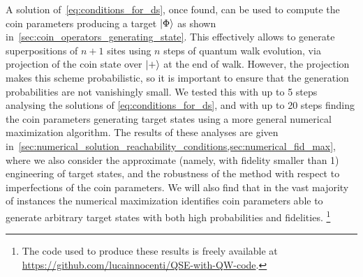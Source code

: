A solution of~\cref{eq:conditions_for_ds}, once found, can be used to compute the coin parameters producing a target $\ket\Phi$ as shown in~\cref{sec:coin_operators_generating_state}.
This effectively allows to generate superpositions of $n+1$ sites using $n$ steps of quantum walk evolution, via projection of the coin state over $\ket+$ at the end of walk.
However, the projection makes this scheme probabilistic, so it is important to ensure that the generation probabilities are not vanishingly small.
We tested this with up to 5 steps analysing the solutions of \cref{eq:conditions_for_ds}, and with up to 20 steps finding the coin parameters generating target states using a more general numerical maximization algorithm.
The results of these analyses are given in~\cref{sec:numerical_solution_reachability_conditions,sec:numerical_fid_max},
where we also consider the approximate (namely, with fidelity smaller than 1) engineering of target states,
and the robustness of the method with respect to imperfections of the coin parameters.
We will also find that in the vast majority of instances the numerical maximization identifies coin parameters able to generate arbitrary target states with both high probabilities and fidelities.
\footnote{The code used to produce these results is freely available at \href{https://github.com/lucainnocenti/QSE-with-QW-code}{https://github.com/lucainnocenti/QSE-with-QW-code}.}

